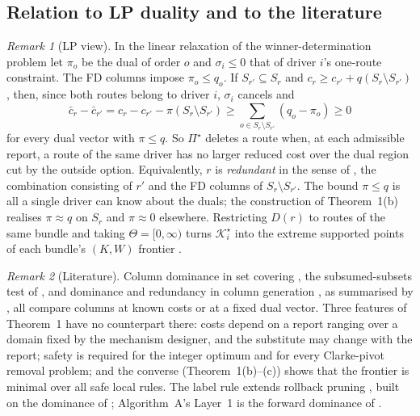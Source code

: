 \documentclass[11pt]{article}
\theoremstyle{definition}
\theoremstyle{remark}
\newtheorem{remark}{Remark}
\newcommand{\Ks}{\mathcal{K}^{\star}}
\begin{document}
\subsection{Relation to LP duality and to the literature}

\begin{remark}[LP view]\label{rem:lp}
In the linear relaxation of the winner-determination problem let $\pi_o$ be
the dual of order $o$ and $\sigma_i\le0$ that of driver $i$'s
one-route constraint. The FD columns impose $\pi_o\le q_o$. If
$S_{r'}\subseteq S_r$ and $c_r\ge c_{r'}+q(S_r\setminus S_{r'})$, then, since
both routes belong to driver $i$, $\sigma_i$ cancels and
\[
\bar c_r-\bar c_{r'}=c_r-c_{r'}-\pi(S_r\setminus S_{r'})
\ge\sum_{o\in S_r\setminus S_{r'}}(q_o-\pi_o)\ge0
\]
for every dual vector with $\pi\le q$. So $\Pi^\star$ deletes a route when, at
each admissible report, a route of the same driver has no larger reduced cost
over the dual region cut by the outside option. Equivalently, $r$ is
\emph{redundant} in the sense of \citet{sol1994column}, the combination
consisting of $r'$ and the FD columns of $S_r\setminus S_{r'}$. The bound
$\pi\le q$ is all a single driver can know about the duals; the construction of
Theorem~1(b) realises $\pi\approx q$ on $S_r$ and $\pi\approx0$ elsewhere.
Restricting $D(r)$ to routes of the same bundle and taking $\Theta=[0,\infty)$
turns $\Ks_i$ into the extreme supported points of each bundle's $(K,W)$
frontier \citep{ehrgott2005multicriteria}.
\end{remark}

\begin{remark}[Literature]\label{rem:lit}
Column dominance in set covering \citep{beasley1987algorithm}, the
subsumed-subsets test of \citet{muller1998solving}, and dominance and
redundancy in column generation \citep{vanderbeck1994thesis,sol1994column}, as
summarised by \citet{lubbecke2005selected}, all compare columns at known costs
or at a fixed dual vector. Three features of Theorem~1 have no counterpart
there: costs depend on a report ranging over a domain fixed by the mechanism
designer, and the substitute may change with the report; safety is required
for the integer optimum and for every Clarke-pivot removal problem; and the
converse (Theorem~1(b)--(c)) shows that the frontier is minimal over all safe
local rules. The label rule extends rollback pruning \citep{lozano2016exact},
built on the dominance of \citet{feillet2004exact}; Algorithm~A's Layer~1 is the
forward dominance of \citet{dumas1991pickup}.
\end{remark}
\end{document}
